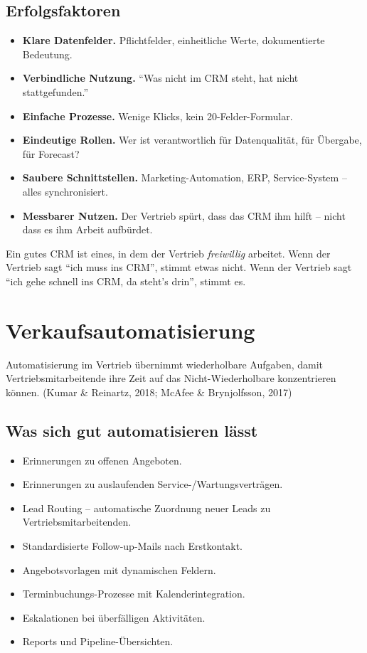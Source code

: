 \documentclass[11pt,a4paper,oneside]{article}
\newcommand{\quelle}[1]{{\footnotesize\color{lpGray}(#1)}}
\begin{document}
\subsection{Erfolgsfaktoren}

\begin{itemize}
  \item \textbf{Klare Datenfelder.} Pflichtfelder, einheitliche Werte, dokumentierte Bedeutung.
  \item \textbf{Verbindliche Nutzung.} ``Was nicht im CRM steht, hat nicht stattgefunden.''
  \item \textbf{Einfache Prozesse.} Wenige Klicks, kein 20-Felder-Formular.
  \item \textbf{Eindeutige Rollen.} Wer ist verantwortlich für Datenqualität, für Übergabe, für Forecast?
  \item \textbf{Saubere Schnittstellen.} Marketing-Automation, ERP, Service-System -- alles synchronisiert.
  \item \textbf{Messbarer Nutzen.} Der Vertrieb spürt, dass das CRM ihm hilft -- nicht dass es ihm Arbeit aufbürdet.
\end{itemize}

\begin{merkbox}
Ein gutes CRM ist eines, in dem der Vertrieb \emph{freiwillig} arbeitet. Wenn der Vertrieb sagt ``ich muss ins CRM'', stimmt etwas nicht. Wenn der Vertrieb sagt ``ich gehe schnell ins CRM, da steht's drin'', stimmt es.
\end{merkbox}

\section{Verkaufsautomatisierung}

Automatisierung im Vertrieb übernimmt wiederholbare Aufgaben, damit Vertriebsmitarbeitende ihre Zeit auf das Nicht-Wiederholbare konzentrieren können. \quelle{Kumar \& Reinartz, 2018; McAfee \& Brynjolfsson, 2017}

\subsection{Was sich gut automatisieren lässt}

\begin{itemize}
  \item Erinnerungen zu offenen Angeboten.
  \item Erinnerungen zu auslaufenden Service-/Wartungsverträgen.
  \item Lead Routing -- automatische Zuordnung neuer Leads zu Vertriebsmitarbeitenden.
  \item Standardisierte Follow-up-Mails nach Erstkontakt.
  \item Angebotsvorlagen mit dynamischen Feldern.
  \item Terminbuchungs-Prozesse mit Kalenderintegration.
  \item Eskalationen bei überfälligen Aktivitäten.
  \item Reports und Pipeline-Übersichten.
\end{itemize}
\end{document}
